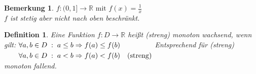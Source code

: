 \documentclass[a4paper,titlepage,oneside]{article}
\def\R{\ensuremath{\mathbb{R}} }
\def\sp{\hspace{0,1cm}}
\def\spcolon{\sp:\sp}
\theoremstyle{thmstyle}
\newtheorem{defi}[satz]{Definition}
\newtheorem{bem}[satz]{Bemerkung}
\theoremstyle{subthmstyle}
\begin{document}
\begin{bem}
$f:(0,1] \to \R \text{ mit } f(x) = \frac{1}{x}$ \\ %
$f$ ist stetig aber nicht nach oben beschränkt.
\end{bem}

\begin{defi}
Eine Funktion $f: D \to \R$ heißt (streng) monoton wachsend, wenn gilt:
\begin{math}\displaystyle \begin{aligned}[t]
&\forall a,b \in D \spcolon a \le b \Rightarrow f(a) \le f(b) \\
&\forall a,b \in D \spcolon a < b \Rightarrow f(a) < f(b) \quad \text{(streng)}
\end{aligned}\end{math} 
Entsprechend für (streng) monoton fallend.
\end{defi}
\end{document}
